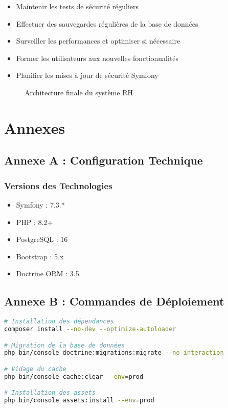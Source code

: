 \documentclass[12pt,a4paper]{article}
\begin{document}
\begin{itemize}
    \item Maintenir les tests de sécurité réguliers
    \item Effectuer des sauvegardes régulières de la base de données
    \item Surveiller les performances et optimiser si nécessaire
    \item Former les utilisateurs aux nouvelles fonctionnalités
    \item Planifier les mises à jour de sécurité Symfony
\end{itemize}

\begin{figure}[H]
    \centering
    \caption{Architecture finale du système RH}
    \label{fig:architecture_finale}
\end{figure}

\section{Annexes}

\subsection{Annexe A : Configuration Technique}

\subsubsection{Versions des Technologies}
\begin{itemize}
    \item Symfony : 7.3.*
    \item PHP : 8.2+
    \item PostgreSQL : 16
    \item Bootstrap : 5.x
    \item Doctrine ORM : 3.5
\end{itemize}

\subsection{Annexe B : Commandes de Déploiement}

\begin{lstlisting}[language=bash, caption=Commandes de mise en production]
# Installation des dépendances
composer install --no-dev --optimize-autoloader

# Migration de la base de données
php bin/console doctrine:migrations:migrate --no-interaction

# Vidage du cache
php bin/console cache:clear --env=prod

# Installation des assets
php bin/console assets:install --env=prod
\end{lstlisting}
\end{document}
